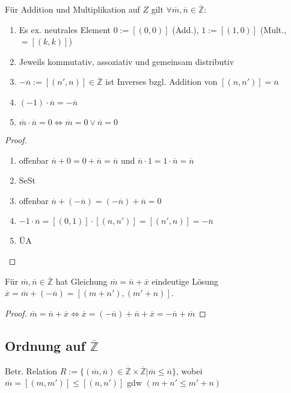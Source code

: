 \begin{proposition}
	Für Addition und Multiplikation auf $Z$ gilt $\forall \overline{m},\overline{n}\in\overline{\mathbb{Z}}$:
	\begin{enumerate}[label={\arabic*)}]
		\item Es ex. neutrales Element $0:=[(0,0)]$ (Add.), $1:=[(1,0)]$ (Mult., $=[(k,k)]$)
		\item Jeweils kommutativ, assoziativ und gemeinsam distributiv
		\item $-\overline{n} := [(n',n)]\in\overline{\mathbb{Z}}$ ist Inverses bzgl. Addition von $[(n,n')]=\overline{n}$
		\item $(-1)\cdot \overline{n} = -\overline{n}$
		\item $\overline{m}\cdot\overline{n} = 0 \Leftrightarrow \overline{m} = 0 \lor \overline{n} = 0$
	\end{enumerate}
\end{proposition}
\begin{proof}
	\begin{enumerate}[label={\arabic*)}]
		\item offenbar $\overline{n}+0=0+\overline{n}=\overline{n}$ und $\overline{n}\cdot 1=1\cdot \overline{n}=\overline{n}$
		\item SeSt
		\item offenbar $\overline{n}+(-\overline{n})=(-\overline{n})+\overline{n}=0$
		\item $-1\cdot\overline{n}=[(0,1)]\cdot[(n,n')]=[(n',n)]=-\overline{n}$
		\item ÜA
	\end{enumerate}
\end{proof}

\begin{proposition}
	Für $\overline{m},\overline{n}\in\overline{\mathbb{Z}}$ hat Gleichung $\overline{m} = \overline{n} + \overline{x}$ eindeutige Lösung $\overline{x} = \overline{m} + (-\overline{n}) = [(m+n'),(m'+n)]$.
\end{proposition}
\begin{proof}
	$\overline{m}=\overline{n}+\overline{x}\iff \overline{x}=(-\overline{n})+\overline{n}+\overline{x}=
	-\overline{n}+\overline{m}$
\end{proof}

\subsection{Ordnung auf \texorpdfstring{$\overline{\mathbb{Z}}$}{Z}}
\begin{*definition}
	Betr. Relation $R:=\{(\overline{m},\overline{n})\in\overline{\mathbb{Z}}\times\overline{\mathbb{Z}} | \overline{m} \le \overline{n}\}$, wobei $\overline{m} = [(m,m')] \le [(n,n')]$ \gls{gdw} $(m+n'\le m'+n)$
\end{*definition}

